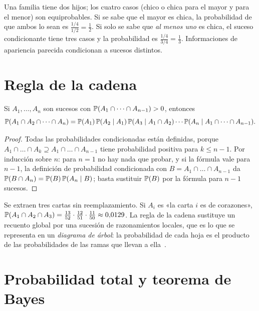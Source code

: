 \begin{ejemplo}\label{ej:t4-hijos}
Una familia tiene dos hijos; los cuatro casos (chico o chica para el mayor y para el menor) son equiprobables. Si se sabe que el mayor es chica, la probabilidad de que ambos lo sean es $\frac{1/4}{1/2}=\frac12$. Si solo se sabe que \emph{al menos uno} es chica, el suceso condicionante tiene tres casos y la probabilidad es $\frac{1/4}{3/4}=\frac13$. Informaciones de apariencia parecida condicionan a sucesos distintos.
\end{ejemplo}

\section{Regla de la cadena}

\begin{teorema}\label{teo:t4-cadena}
Si $A_1,\dots,A_n$ son sucesos con $\mathbb{P}(A_1\cap\dots\cap A_{n-1})>0$, entonces
\[
\mathbb{P}(A_1\cap A_2\cap\dots\cap A_n)=\mathbb{P}(A_1)\,\mathbb{P}(A_2\mid A_1)\,\mathbb{P}(A_3\mid A_1\cap A_2)\cdots\mathbb{P}(A_n\mid A_1\cap\dots\cap A_{n-1}).
\]
\end{teorema}

\begin{proof}
Todas las probabilidades condicionadas están definidas, porque $A_1\cap\dots\cap A_k\supseteq A_1\cap\dots\cap A_{n-1}$ tiene probabilidad positiva para $k\le n-1$. Por inducción sobre $n$: para $n=1$ no hay nada que probar, y si la fórmula vale para $n-1$, la definición de probabilidad condicionada con $B=A_1\cap\dots\cap A_{n-1}$ da $\mathbb{P}(B\cap A_n)=\mathbb{P}(B)\,\mathbb{P}(A_n\mid B)$; basta sustituir $\mathbb{P}(B)$ por la fórmula para $n-1$ sucesos.
\end{proof}

\begin{ejemplo}
Se extraen tres cartas sin reemplazamiento. Si $A_i$ es «la carta $i$ es de corazones», $\mathbb{P}(A_1\cap A_2\cap A_3)=\frac{13}{52}\cdot\frac{12}{51}\cdot\frac{11}{50}\approx0{,}0129$. La regla de la cadena sustituye un recuento global por una sucesión de razonamientos locales, que es lo que se representa en un \emph{diagrama de árbol}: la probabilidad de cada hoja es el producto de las probabilidades de las ramas que llevan a ella~\cite[§16.2]{mcs}.
\end{ejemplo}

\section{Probabilidad total y teorema de Bayes}


